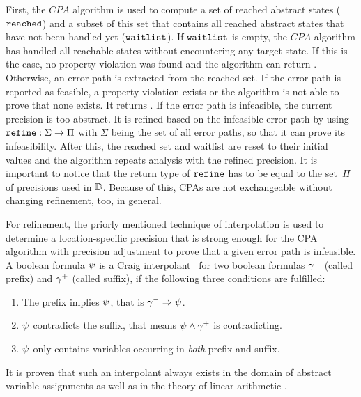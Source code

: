 First, the $CPA$ algorithm is used to compute a set of reached abstract states ($\texttt{reached}$) and a subset of this set that contains all reached abstract states that have not been handled yet ($\texttt{waitlist}$).
If $\texttt{waitlist}$ is empty, the $CPA$ algorithm has handled all reachable states without encountering any target state.
If this is the case, no property violation was found and the algorithm can return \safe.
Otherwise, an error path is extracted from the reached set.
If the error path is reported as feasible, a property violation exists or the algorithm is not able to prove that none exists. It returns \unsafe.
If the error path is infeasible, the current precision is too abstract.
It is refined based on the infeasible error path by using $\texttt{refine} : \Sigma \rightarrow \Pi$ with $\Sigma$ being the set of all error paths, so that it can prove its infeasibility.
After this, the reached set and waitlist are reset to their initial values and the algorithm repeats analysis with the refined precision.
It is important to notice that the return type of $\texttt{refine}$ has to be equal to the set~$\Pi$ of precisions used in $\mathbb{D}$.
Because of this, CPAs are not exchangeable without changing refinement, too, in general.

For refinement, the priorly mentioned technique of interpolation is used to determine a location-specific precision that is strong enough for the CPA algorithm with precision adjustment to prove that a given error path is infeasible.
A boolean formula $\psi$ is a Craig interpolant \cite{Craig1957}\ for two boolean formulas ${\gamma^{-}}$ (called prefix) and ${\gamma^{+}}$ (called suffix), if the following three conditions are fulfilled:
\begin{enumerate}[label=\alph*)]
\item The prefix implies $\psi$, that is ${\gamma^{-}} \Rightarrow \psi$.
\item $\psi$ contradicts the suffix, that means $\psi \wedge {\gamma^{+}}$ is contradicting.
\item $\psi$ only contains variables occurring in \emph{both} prefix and suffix.
\end{enumerate}
It is proven that such an interpolant always exists in the domain of abstract variable assignments \cite{Beyer2013} as well as in the theory of linear arithmetic \cite{Craig1957}.

